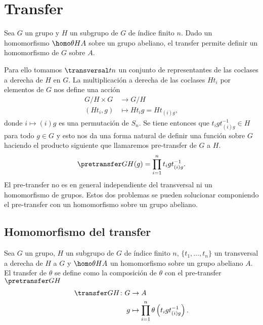 
\chapter{Transfer}

Sea $G$ un grupo y $H$ un subgrupo de $G$ de índice finito $n$. Dado un homomorfismo $\homo \theta H A$ sobre un grupo abeliano, el transfer permite definir un homomorfismo de $G$ sobre $A$. %

Para ello tomamos $\transversal t n$ un conjunto de representantes de las coclases a derecha de $H$ en $G$. La multiplicación a derecha de las coclases $Ht_i$ por elementos de $G$ nos define una acción
\begin{align}\label{minitransfer}
	G/H\times G &\to {G/H} \nonumber\\
	(Ht_i,g) &\mapsto Ht_ig = Ht_{(i)g},
\end{align}
donde $i\mapsto (i)g$ es una permutación de $S_n$. Se tiene entonces que $t_igt_{(i)g}^{-1}\in H$ para todo $g\in G$ y esto nos da una forma natural de definir una función sobre $G$ haciendo el producto siguiente que llamaremos pre-transfer de $G$ a $H$.
\begin{equation}
	{\pretransfer G H}(g)= \prod_{i=1}^n t_igt_{(i)g}^{-1}.
\end{equation}
El pre-transfer no es en general independiente del transversal ni un homomorfismo de grupos. Estos dos problemas se pueden solucionar componiendo el pre-transfer con un homomorfismo sobre un grupo abeliano.

\section{Homomorfismo del transfer}

\begin{definicion}
	Sea $G$ un grupo, $H$ un subgrupo de $G$ de índice finito $n$, $\{t_1,\ldots, t_n\}$ un transversal a derecha de $H$ a $G$ y $\homo \theta H A$ un homomorfismo sobre un grupo abeliano $A$. El transfer de $\theta$ se define como la composición de $\theta$ con el pre-transfer $\pretransfer G H$
	\begin{align}
		{\transfer G H} \colon 	G &\to A \nonumber \\
							g &\mapsto \prod_{i=1}^n \theta\left(t_igt_{(i)g}^{-1}\right).
	\end{align}
	
\end{definicion}

